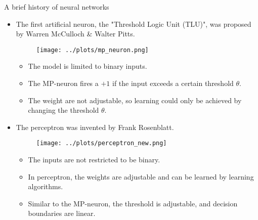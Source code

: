







\begin{vbframe}{A brief history of neural networks}
\begin{itemize}
\item {} The first artificial neuron, the "Threshold Logic Unit (TLU)", was proposed by Warren McCulloch \& Walter Pitts.
\begin{figure}
\texttt{[image: ../plots/mp\_neuron.png]}
\end{figure}
\begin{itemize}
\item The model is limited to binary inputs.
\vspace{2mm}
\item The MP-neuron fires a $+1$ if the input exceeds a certain threshold $\theta$.
\vspace{2mm}
\item The weight are not adjustable, so learning could only be achieved by changing the threshold $\theta$.
\end{itemize}
\end{itemize}
\framebreak

\begin{itemize}
\item {} The perceptron was invented by Frank Rosenblatt. 
\begin{figure}
\texttt{[image: ../plots/perceptron\_new.png]}
\end{figure}
\begin{itemize}
\vspace{2mm}
\item The inputs are not restricted to be binary.
\vspace{2mm}
\item In perceptron, the weights are adjustable and can be learned by learning algorithms.
\vspace{2mm}
\item Similar to the MP-neuron, the threshold is adjustable, and decision boundaries are linear.
\end{itemize}
\end{itemize}
\framebreak


\end{vbframe}
